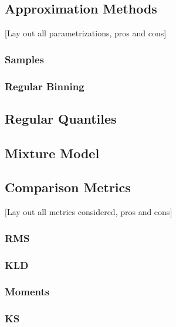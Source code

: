 \documentclass[\docopts]{\docclass}
\begin{document}
\subsection{Approximation Methods}
\label{sec:approx}

[Lay out all parametrizations, pros and cons]

\subsubsection{Samples}
\label{sec:samples}

\subsubsection{Regular Binning}
\label{sec:bins}

\subsection{Regular Quantiles}
\label{sec:quantiles}

\subsection{Mixture Model}
\label{sec:gmm}

\subsection{Comparison Metrics}
\label{sec:metrics}

[Lay out all metrics considered, pros and cons]

\subsubsection{RMS}
\label{sec:rms}

\subsubsection{KLD}
\label{sec:kld}

\subsubsection{Moments}
\label{sec:moments}

\subsubsection{KS}
\label{sec:ks}
\end{document}
